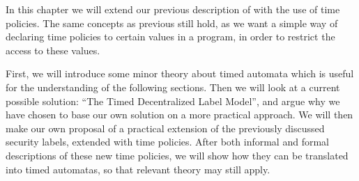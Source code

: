
In this chapter we will extend our previous description of \thelang{} with the use of time policies.
The same concepts as previous still hold, as we want a simple way of declaring time policies to certain values in a program, in order to restrict the access to these values.

First, we will introduce some minor theory about timed automata which is useful for the understanding of the following sections.
Then we will look at a current possible solution: ``The Timed Decentralized Label Model'', and argue why we have chosen to base our own solution on a more practical approach.
We will then make our own proposal of a practical extension of the previously discussed security labels, extended with time policies.
After both informal and formal descriptions of these new time policies, we will show how they can be translated into timed automatas, so that relevant theory may still apply.
